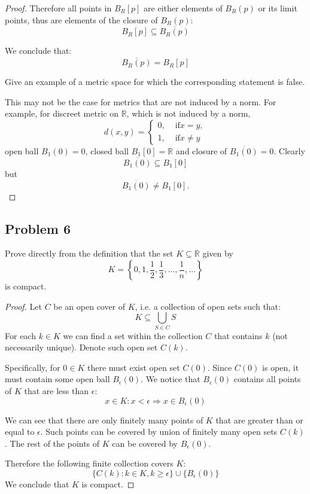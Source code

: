 \documentclass{article}
\begin{document}
\begin{proof}
Therefore all points in $B_R[p]$ are either elements of $B_R(p)$ or its limit points, thus are elements of the closure of $B_R(p)$:
$$ B_R[p] \subseteq \overline{B_R(p)} $$

We conclude that:
$$ \overline{B_R(p)} = B_R[p] $$

\begin{tcolorbox}
Give an example of a metric space for which the corresponding statement is false.
\end{tcolorbox}

This may not be the case for metrics that are not induced by a norm. For example, for discreet metric on $\mathbb{R}$, which is not induced by a norm,
$$d(x, y) = 
\begin{cases}
0, & \text{ if} x = y,\\
1, & \text{ if} x \neq y
\end{cases}
$$
open ball $B_1(0) = {0}$, closed ball $B_1[0] = \mathbb{R}$ and closure of $\overline{B_1(0)} = {0}$. Clearly
$$ \overline{B_1(0)} \subseteq B_1[0] $$
but
$$ \overline{B_1(0)} \neq B_1[0]. $$

\end{proof}

\subsection*{Problem 6}

\begin{tcolorbox}
Prove directly from the definition that the set $K \subseteq \mathbb{R}$ given by
$$ K = \left\{ 0, 1, \frac{1}{2}, \frac{1}{3}, \dots , \frac{1}{n}, \dots \right\}$$ 
is compact.
\end{tcolorbox}

\begin{proof}
Let $C$ be an open cover of $K$, i.e. a collection of open sets such that:
$$ K \subseteq \bigcup_{S \in C} S $$
For each $k \in K$ we can find a set within the collection $C$ that contains $k$ (not necessarily unique). Denote such open set $C(k)$.

Specifically, for $0 \in K$ there must exist open set $C(0)$. Since $C(0)$ is open, it must contain some open ball $B_\epsilon(0)$. We notice that $B_\epsilon(0)$ contains all points of $K$ that are less than $\epsilon$:
$$ x \in K : x < \epsilon \Rightarrow x \in B_\epsilon(0) $$

We can see that there are only finitely many points of $K$ that are greater than or equal to $\epsilon$. Such points can be covered by union of finitely many open sets $C(k)$. The rest of the points of $K$ can be covered by $B_\epsilon(0)$.

Therefore the following finite collection covers $K$:
$$ \{ C(k) : k \in K, k \geq \epsilon \}  \cup \{ B_\epsilon(0) \} $$
We conclude that $K$ is compact.
\end{proof}
\end{document}
